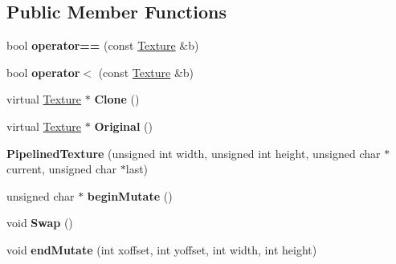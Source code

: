 \subsection*{Public Member Functions}
\begin{DoxyCompactItemize}
\item 
bool {\bfseries operator==} (const \hyperlink{classTexture}{Texture} \&b)\hypertarget{classPipelinedTexture_a4e29a60c734fe74fd4030603ba17754d}{}\label{classPipelinedTexture_a4e29a60c734fe74fd4030603ba17754d}

\item 
bool {\bfseries operator$<$} (const \hyperlink{classTexture}{Texture} \&b)\hypertarget{classPipelinedTexture_a52bb18499cdf1ccd967ce70f33b9471b}{}\label{classPipelinedTexture_a52bb18499cdf1ccd967ce70f33b9471b}

\item 
virtual \hyperlink{classTexture}{Texture} $\ast$ {\bfseries Clone} ()\hypertarget{classPipelinedTexture_a5f681d03a90bcf87d034f0676f8cc21d}{}\label{classPipelinedTexture_a5f681d03a90bcf87d034f0676f8cc21d}

\item 
virtual \hyperlink{classTexture}{Texture} $\ast$ {\bfseries Original} ()\hypertarget{classPipelinedTexture_a9e2b5de6aab5ab92448dbe1277c97cde}{}\label{classPipelinedTexture_a9e2b5de6aab5ab92448dbe1277c97cde}

\item 
{\bfseries Pipelined\+Texture} (unsigned int width, unsigned int height, unsigned char $\ast$current, unsigned char $\ast$last)\hypertarget{classPipelinedTexture_ac4cbbd01dca2795fd9a2923c2f81f036}{}\label{classPipelinedTexture_ac4cbbd01dca2795fd9a2923c2f81f036}

\item 
unsigned char $\ast$ {\bfseries begin\+Mutate} ()\hypertarget{classPipelinedTexture_a571f40d5df2b65ce7ca5a732693618ec}{}\label{classPipelinedTexture_a571f40d5df2b65ce7ca5a732693618ec}

\item 
void {\bfseries Swap} ()\hypertarget{classPipelinedTexture_ab4a6f376616e0286ccfbf00fe52e90a4}{}\label{classPipelinedTexture_ab4a6f376616e0286ccfbf00fe52e90a4}

\item 
void {\bfseries end\+Mutate} (int xoffset, int yoffset, int width, int height)\hypertarget{classPipelinedTexture_a60cbae9d44bb2674f73eccca7965a441}{}\label{classPipelinedTexture_a60cbae9d44bb2674f73eccca7965a441}


\end{DoxyCompactItemize}
